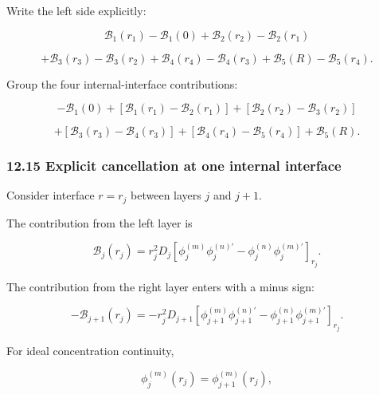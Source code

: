 \documentclass[11pt,a4paper]{article}
\begin{document}
Write the left side explicitly:

\begin{equation}
\mathcal B_1(r_1)-\mathcal B_1(0)
+
\mathcal B_2(r_2)-\mathcal B_2(r_1)
\end{equation}

\begin{equation}
+
\mathcal B_3(r_3)-\mathcal B_3(r_2)
+
\mathcal B_4(r_4)-\mathcal B_4(r_3)
+
\mathcal B_5(R)-\mathcal B_5(r_4).
\tag{TRISO-ML-501}
\label{eq:triso-ml-501}
\end{equation}

Group the four internal-interface contributions:

\begin{equation}
-\mathcal B_1(0)
+
\left[
\mathcal B_1(r_1)-\mathcal B_2(r_1)
\right]
+
\left[
\mathcal B_2(r_2)-\mathcal B_3(r_2)
\right]
\end{equation}

\begin{equation}
+
\left[
\mathcal B_3(r_3)-\mathcal B_4(r_3)
\right]
+
\left[
\mathcal B_4(r_4)-\mathcal B_5(r_4)
\right]
+
\mathcal B_5(R).
\tag{TRISO-ML-502}
\label{eq:triso-ml-502}
\end{equation}

\subsubsection*{12.15 Explicit cancellation at one internal interface}

Consider interface $r=r_j$ between layers $j$ and $j+1$.

The contribution from the left layer is

\begin{equation}
\mathcal B_j(r_j)
=
r_j^2D_j
\left[
\phi_j^{(m)}\phi_j^{(n)\prime}
-
\phi_j^{(n)}\phi_j^{(m)\prime}
\right]_{r_j}.
\tag{TRISO-ML-503}
\label{eq:triso-ml-503}
\end{equation}

The contribution from the right layer enters with a minus sign:

\begin{equation}
-\mathcal B_{j+1}(r_j)
=
-r_j^2D_{j+1}
\left[
\phi_{j+1}^{(m)}\phi_{j+1}^{(n)\prime}
-
\phi_{j+1}^{(n)}\phi_{j+1}^{(m)\prime}
\right]_{r_j}.
\tag{TRISO-ML-504}
\label{eq:triso-ml-504}
\end{equation}

For ideal concentration continuity,

\begin{equation}
\phi_j^{(m)}(r_j)
=
\phi_{j+1}^{(m)}(r_j),
\tag{TRISO-ML-505}
\label{eq:triso-ml-505}
\end{equation}
\end{document}
